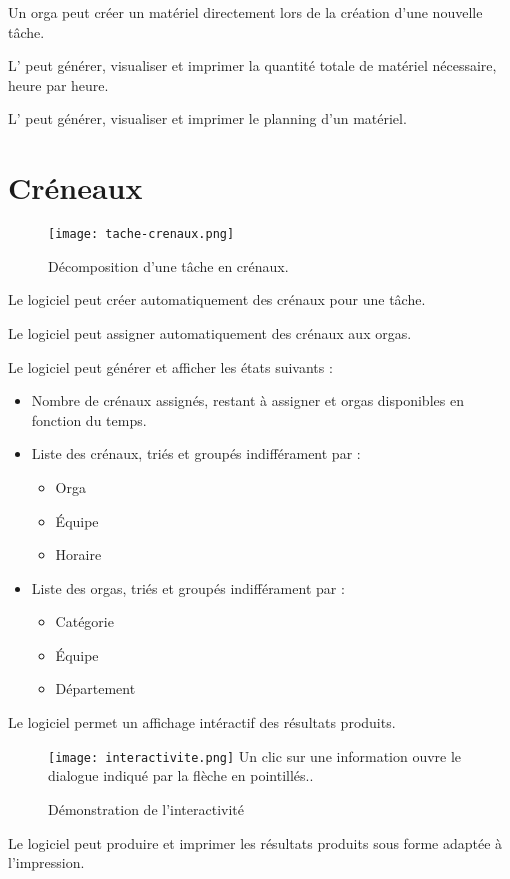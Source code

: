 Un orga peut créer un matériel directement lors de la création d'une nouvelle tâche.

L'\oh{} peut générer, visualiser et imprimer la quantité totale de matériel nécessaire, heure par heure.

L'\oh{} peut générer, visualiser et imprimer le planning d'un matériel.

\section{Créneaux}
\begin{figure}[h!t]
\centering
\texttt{[image: tache-crenaux.png]}
\label{fig:ptaches}
\caption{Décomposition d'une tâche en crénaux.}
\end{figure}



Le logiciel peut créer automatiquement des crénaux pour une tâche.

Le logiciel peut assigner automatiquement des crénaux aux orgas.

Le logiciel peut générer et afficher les états suivants : 

\begin{itemize}
\item Nombre de crénaux assignés, restant à assigner et orgas disponibles en fonction du temps.
\item Liste des crénaux, triés et groupés indifférament par : 	\begin{itemize}
								  \item Orga
								  \item Équipe
								  \item Horaire
								 \end{itemize}
\item Liste des orgas, triés et groupés indifférament par :  	\begin{itemize}
								  \item Catégorie
								  \item Équipe
								  \item Département
								 \end{itemize}
                                     

\end{itemize}



Le logiciel permet un affichage intéractif des résultats produits.

\begin{figure}[h!t]
\centering
\texttt{[image: interactivite.png]}
\label{fig:ptaches}
Un clic sur une information ouvre le dialogue indiqué par la flèche en pointillés..
\caption{Démonstration de l'interactivité}
\end{figure}
\clearpage


Le logiciel peut produire et imprimer les résultats produits sous forme adaptée à l'impression.
